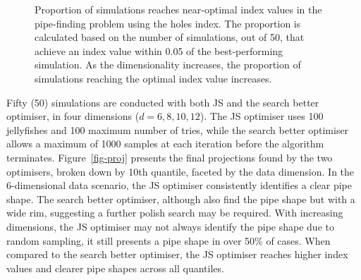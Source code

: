 \documentclass[
  number,
  preprint,
  3p]{elsarticle}
\begin{document}
\begin{figure}


\caption{\label{fig-proportion}Proportion of simulations reaches
near-optimal index values in the pipe-finding problem using the holes
index. The proportion is calculated based on the number of simulations,
out of 50, that achieve an index value within 0.05 of the
best-performing simulation. As the dimensionality increases, the
proportion of simulations reaching the optimal index value increases.}

\end{figure}%

Fifty (50) simulations are conducted with both JS and the search better
optimiser, in four dimensions (\(d = 6, 8, 10, 12\)). The JS optimiser
uses 100 jellyfishes and 100 maximum number of tries, while the search
better optimiser allows a maximum of 1000 samples at each iteration
before the algorithm terminates. Figure~\ref{fig-proj} presents the
final projections found by the two optimisers, broken down by 10th
quantile, faceted by the data dimension. In the 6-dimensional data
scenario, the JS optimiser consistently identifies a clear pipe shape.
The search better optimiser, although also find the pipe shape but with
a wide rim, suggesting a further polish search may be required. With
increasing dimensions, the JS optimiser may not always identify the pipe
shape due to random sampling, it still presents a pipe shape in over
50\% of cases. When compared to the search better optimiser, the JS
optimiser reaches higher index values and clearer pipe shapes across all
quantiles.
\end{document}
